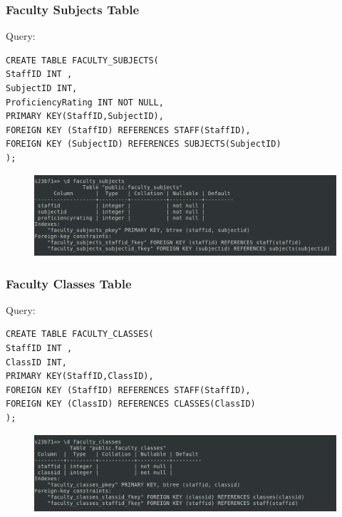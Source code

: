 \documentclass{article}
\begin{document}
\subsubsection*{Faculty Subjects Table}
Query:
\begin{Verbatim}[frame=single,framerule=1pt,fontfamily=courier,fontsize=\small]
CREATE TABLE FACULTY_SUBJECTS(
StaffID INT ,
SubjectID INT,
ProficiencyRating INT NOT NULL,
PRIMARY KEY(StaffID,SubjectID),
FOREIGN KEY (StaffID) REFERENCES STAFF(StaffID),
FOREIGN KEY (SubjectID) REFERENCES SUBJECTS(SubjectID)
);
\end{Verbatim}
\begin{figure}[H]
    \centering
    \includegraphics[width=\textwidth]{schema/faculty_subjects.png}
\end{figure}

\subsubsection*{Faculty Classes Table}
Query:
\begin{Verbatim}[frame=single,framerule=1pt,fontfamily=courier,fontsize=\small]
CREATE TABLE FACULTY_CLASSES(
StaffID INT ,
ClassID INT,
PRIMARY KEY(StaffID,ClassID),
FOREIGN KEY (StaffID) REFERENCES STAFF(StaffID),
FOREIGN KEY (ClassID) REFERENCES CLASSES(ClassID)
);
\end{Verbatim}
\begin{figure}[H]
    \centering
    \includegraphics[width=\textwidth]{schema/faculty_classes.png}
\end{figure}
\end{document}

